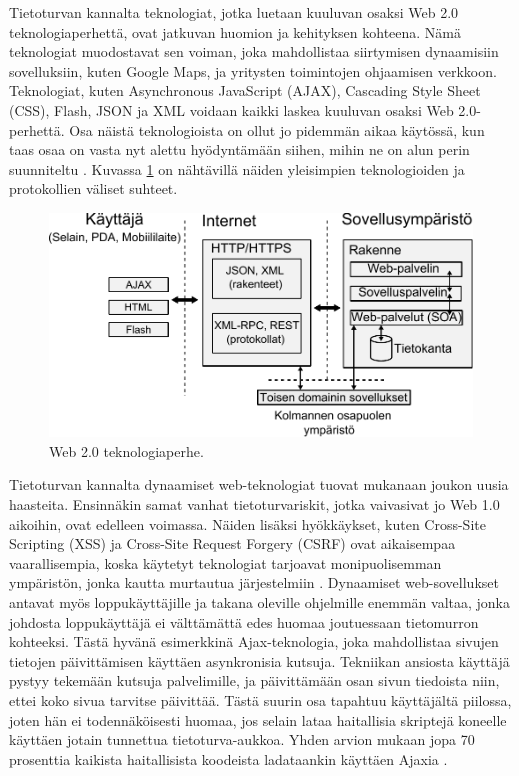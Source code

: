 Tietoturvan kannalta teknologiat, jotka luetaan kuuluvan osaksi Web 2.0
teknologiaperhettä, ovat jatkuvan huomion ja kehityksen kohteena. Nämä teknologiat
muodostavat sen voiman, joka mahdollistaa siirtymisen dynaamisiin
sovelluksiin, kuten Google Maps, ja yritysten toimintojen ohjaamisen verkkoon.
Teknologiat, kuten Asynchronous JavaScript (AJAX), Cascading Style Sheet (CSS),
Flash, JSON ja XML voidaan kaikki laskea kuuluvan osaksi Web 2.0-perhettä.
Osa näistä teknologioista on ollut jo pidemmän aikaa käytössä, kun taas osaa on
vasta nyt alettu hyödyntämään siihen, mihin ne on alun perin suunniteltu \cite{WEB2}.
Kuvassa \ref{web} on nähtävillä näiden yleisimpien teknologioiden ja protokollien
väliset suhteet.

\begin{figure}[htp]
\centering
\includegraphics[width=12cm]{pics/web_ymparisto.pdf}
\caption{Web 2.0 teknologiaperhe.}
\label{web}
\end{figure}

Tietoturvan kannalta dynaamiset web-teknologiat tuovat mukanaan joukon uusia haasteita. Ensinnäkin
samat vanhat tietoturvariskit, jotka vaivasivat jo Web 1.0 aikoihin, ovat edelleen voimassa. Näiden lisäksi
hyökkäykset, kuten Cross-Site Scripting (XSS) ja Cross-Site Request Forgery (CSRF) 
ovat aikaisempaa vaarallisempia, koska käytetyt teknologiat tarjoavat
monipuolisemman ympäristön, jonka kautta murtautua järjestelmiin \cite{WEB2}. Dynaamiset
web-sovellukset antavat myös loppukäyttäjille ja takana oleville ohjelmille enemmän
valtaa, jonka johdosta loppukäyttäjä ei välttämättä edes huomaa joutuessaan
tietomurron kohteeksi. Tästä hyvänä esimerkkinä Ajax-teknologia, joka mahdollistaa
sivujen tietojen päivittämisen käyttäen asynkronisia kutsuja. Tekniikan ansiosta
käyttäjä pystyy tekemään kutsuja palvelimille, ja päivittämään osan sivun
tiedoista niin, ettei koko sivua tarvitse päivittää. Tästä suurin osa tapahtuu
käyttäjältä piilossa, joten hän ei todennäköisesti huomaa, jos selain lataa
haitallisia skriptejä koneelle käyttäen jotain tunnettua tietoturva-aukkoa. Yhden
arvion mukaan jopa 70 prosenttia kaikista haitallisista koodeista ladataankin käyttäen
Ajaxia \cite{WEB2c}.

